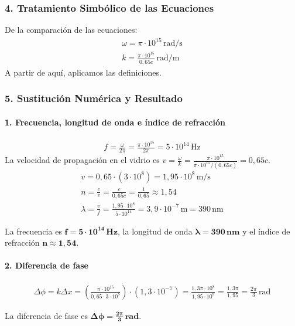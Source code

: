 \subsubsection*{4. Tratamiento Simbólico de las Ecuaciones}
De la comparación de las ecuaciones:
\begin{gather}
    \omega = \pi \cdot 10^{15} \, \text{rad/s} \\
    k = \frac{\pi \cdot 10^{15}}{0,65c} \, \text{rad/m}
\end{gather}
A partir de aquí, aplicamos las definiciones.

\subsubsection*{5. Sustitución Numérica y Resultado}
\paragraph*{1. Frecuencia, longitud de onda e índice de refracción}
\begin{gather}
    f = \frac{\omega}{2\pi} = \frac{\pi \cdot 10^{15}}{2\pi} = 5 \cdot 10^{14} \, \text{Hz}
\end{gather}
La velocidad de propagación en el vidrio es $v = \frac{\omega}{k} = \frac{\pi \cdot 10^{15}}{\pi \cdot 10^{15} / (0,65c)} = 0,65c$.
\begin{gather}
    v = 0,65 \cdot (3\cdot10^8) = 1,95 \cdot 10^8 \, \text{m/s} \\
    n = \frac{c}{v} = \frac{c}{0,65c} = \frac{1}{0,65} \approx 1,54 \\
    \lambda = \frac{v}{f} = \frac{1,95 \cdot 10^8}{5 \cdot 10^{14}} = 3,9 \cdot 10^{-7} \, \text{m} = 390 \, \text{nm}
\end{gather}
\begin{cajaresultado}
    La frecuencia es $\boldsymbol{f=5 \cdot 10^{14}\,Hz}$, la longitud de onda $\boldsymbol{\lambda=390\,nm}$ y el índice de refracción $\boldsymbol{n \approx 1,54}$.
\end{cajaresultado}

\paragraph*{2. Diferencia de fase}
\begin{gather}
    \Delta\phi = k \Delta x = \left(\frac{\pi \cdot 10^{15}}{0,65 \cdot 3\cdot10^8}\right) \cdot (1,3 \cdot 10^{-7}) = \frac{1,3 \pi \cdot 10^8}{1,95 \cdot 10^8} = \frac{1,3 \pi}{1,95} = \frac{2\pi}{3} \, \text{rad}
\end{gather}
\begin{cajaresultado}
    La diferencia de fase es $\boldsymbol{\Delta\phi = \frac{2\pi}{3} \, rad}$.
\end{cajaresultado}

